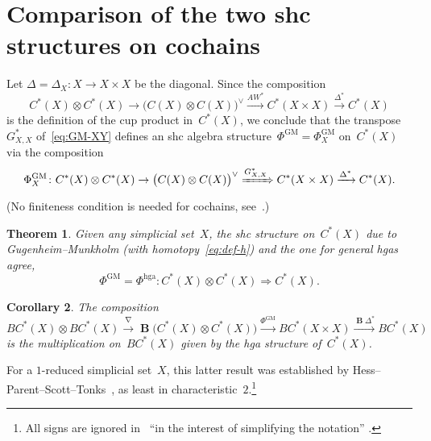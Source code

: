 \documentclass[letterpaper]{amsart}
\numberwithin{equation}{section}
\theoremstyle{plain}
\newtheorem{theorem}{Theorem}[section]
\newtheorem{corollary}[theorem]{Corollary}
\theoremstyle{definition}
\theoremstyle{remark}
\DeclareMathOperator{\BB}{\mathbf{B}}
\let\shuffle\nabla
\def\PhiGM{\Phi^{\mathrm{GM}}}
\def\Phihga{\Phi^{\mathrm{hga}}}
\def\AW{AW}
\begin{document}
\section{Comparison of the two shc structures on cochains}
\label{sec:compare-shc}

Let $\Delta=\Delta_{X}\colon X\to X\times X$ be the diagonal.
Since the composition
\begin{equation}
  C^{*}(X)\otimes C^{*}(X) \to \bigl(C(X)\otimes C(X)\bigr)^{\vee} \xrightarrow{\AW^{*}} C^{*}(X\times X) \xrightarrow{\Delta^{*}} C^{*}(X)
\end{equation}
is the definition of the cup product in~$C^{*}(X)$, we conclude that the transpose~$G_{X,X}^{*}$ of~\eqref{eq:GM-XY}
defines an shc algebra structure~$\PhiGM=\PhiGM_{X}$ on~$C^{*}(X)$ via the composition
\begin{equation}
  \label{eq:def-PhiGM}
  \PhiGM_{X}\colon
  C^{*}(X)\otimes C^{*}(X) \to \bigl(C(X)\otimes C(X)\bigr)^{\vee} \xRightarrow{G_{X,X}^{*}} C^{*}(X\times X) \xrightarrow{\Delta^{*}} C^{*}(X).
\end{equation}
(No finiteness condition is needed for cochains, see~\cite[\S 4.1$_{*}$]{GugenheimMunkholm:1974}.)

\begin{theorem}
  \label{thm:Phihga-PhiGM}
  Given any simplicial set~$X$,
  the shc structure on~$C^{*}(X)$ due to Gugenheim--Munkholm (with homotopy~\eqref{eq:def-h})
  and the one for general hgas agree,
  \begin{equation}
     \PhiGM = \Phihga \colon C^{*}(X)\otimes C^{*}(X) \Rightarrow C^{*}(X).
  \end{equation}
\end{theorem}

\begin{corollary}
  \label{thm:mult-bar-GM}
  The composition
  \begin{equation*}
    B C^{*}(X) \otimes B C^{*}(X) \xrightarrow{\shuffle} \BB\bigl(C^{*}(X)\otimes C^{*}(X)\bigr)
    \xrightarrow{\PhiGM} B C^{*}(X\times X) \xrightarrow{\BB\Delta^{*}} B C^{*}(X)
  \end{equation*}
  is the multiplication on~$B C^{*}(X)$ given by the hga structure of~$C^{*}(X)$.
\end{corollary}

For a $1$-reduced simplicial set~$X$, this latter result was established
by Hess--Parent--Scott--Tonks~\cite[Sec.~5]{HessEtAl:2006}, as least in characteristic~$2$.\footnote{%
  All signs are ignored in~\cite[Sec.~5]{HessEtAl:2006} ``in the interest of simplifying the notation'' \cite[p.~870]{HessEtAl:2006}.}
\end{document}
